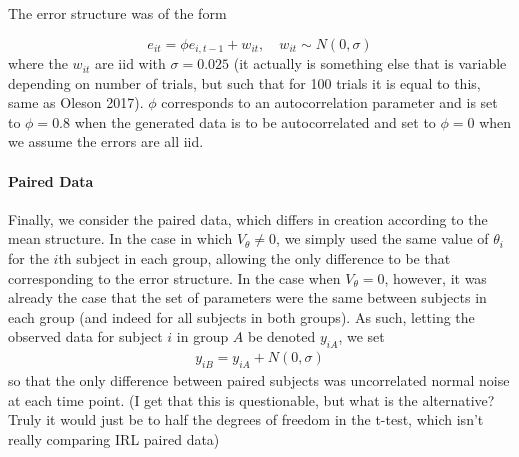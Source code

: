 \documentclass{article}
\begin{document}
The error structure was of the form

\begin{equation}
e_{it} = \phi e_{i, t-1} + w_{it}, \quad w_{it} \sim N(0, \sigma)
\end{equation}
where the $w_{it}$ are iid with $\sigma = 0.025$ (it actually is something else that is variable depending on number of trials, but such that for 100 trials it is equal to this, same as Oleson 2017). $\phi$ corresponds to an autocorrelation parameter and is set to $\phi = 0.8$ when the generated data is to be autocorrelated and set to $\phi = 0$ when we assume the errors are all iid. 

\paragraph{Paired Data} Finally, we consider the paired data, which differs in creation according to the mean structure. In the case in which $V_{\theta} \not= 0$, we simply used the same value of $\theta_i$ for the $i$th subject in each group, allowing the only difference to be that corresponding to the error structure. In the case when $V_{\theta} = 0$, however, it was already the case that the set of parameters were the same between subjects in each group (and indeed for all subjects in both groups). As such, letting the observed data for subject $i$ in group $A$ be denoted $y_{iA}$, we set
\begin{align*}
y_{iB} = y_{iA} + N(0, \sigma)
\end{align*}
so that the only difference between paired subjects was uncorrelated normal noise at each time point. (I get that this is questionable, but what is the alternative? Truly it would just be to half the degrees of freedom in the t-test, which isn't really comparing IRL paired data)

%
%
%
%
\end{document}
